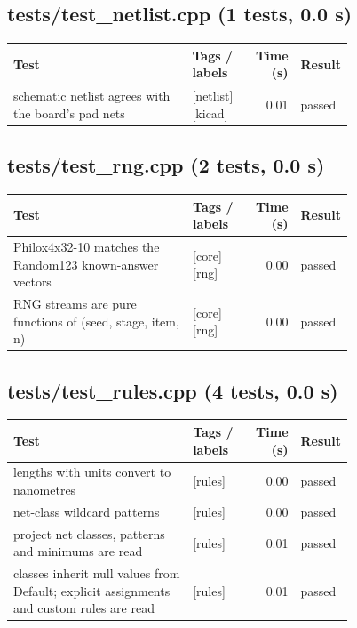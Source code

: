 \subsection*{tests/\allowbreak{}test\_\allowbreak{}netlist.cpp (1 tests, 0.0 s)}
\begin{longtable}{@{}p{0.57\linewidth}p{0.19\linewidth}rl@{}}
\toprule Test & Tags / labels & Time (s) & Result \\ \midrule \endhead
schematic netlist agrees with the board's pad nets & {\footnotesize [netlist][kicad]} & 0.01 & passed \\
\bottomrule\end{longtable}
\subsection*{tests/\allowbreak{}test\_\allowbreak{}rng.cpp (2 tests, 0.0 s)}
\begin{longtable}{@{}p{0.57\linewidth}p{0.19\linewidth}rl@{}}
\toprule Test & Tags / labels & Time (s) & Result \\ \midrule \endhead
Philox4x32-10 matches the Random123 known-answer vectors & {\footnotesize [core][rng]} & 0.00 & passed \\
RNG streams are pure functions of (seed, stage, item, n) & {\footnotesize [core][rng]} & 0.00 & passed \\
\bottomrule\end{longtable}
\subsection*{tests/\allowbreak{}test\_\allowbreak{}rules.cpp (4 tests, 0.0 s)}
\begin{longtable}{@{}p{0.57\linewidth}p{0.19\linewidth}rl@{}}
\toprule Test & Tags / labels & Time (s) & Result \\ \midrule \endhead
lengths with units convert to nanometres & {\footnotesize [rules]} & 0.00 & passed \\
net-class wildcard patterns & {\footnotesize [rules]} & 0.00 & passed \\
project net classes, patterns and minimums are read & {\footnotesize [rules]} & 0.01 & passed \\
classes inherit null values from Default; explicit assignments and custom rules are read & {\footnotesize [rules]} & 0.01 & passed \\
\bottomrule\end{longtable}
